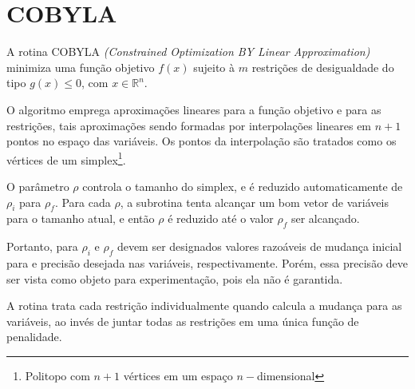 %
%
%

\section{COBYLA}

A rotina COBYLA \emph{(Constrained Optimization BY Linear Approximation)}
minimiza uma função objetivo $f(x)$ sujeito à $m$ restrições de desigualdade
do tipo $g(x)\leq0$, com $x\in\mathbb{R}^n$.

O algoritmo emprega aproximações lineares para a função objetivo e para as
restrições, tais aproximações sendo formadas por interpolações lineares em
$n+1$ pontos no espaço das variáveis. Os pontos da interpolação são tratados
como os vértices de um simplex\footnote{Politopo com $n+1$ vértices em um
espaço $n-$dimensional}.

O parâmetro $\rho$ controla o tamanho do simplex, e é reduzido automaticamente
de $\rho_i$ para $\rho_f$. Para cada $\rho$, a subrotina tenta alcançar um bom
vetor de variáveis para o tamanho atual, e então $\rho$ é reduzido até o valor
$\rho_f$ ser alcançado.

Portanto, para $\rho_i$ e $\rho_f$ devem ser designados valores razoáveis de
mudança inicial para e precisão desejada nas variáveis, respectivamente. Porém,
essa precisão deve ser vista como objeto para experimentação, pois ela não é
garantida.

A rotina trata cada restrição individualmente quando calcula a mudança para as
variáveis, ao invés de juntar todas as restrições em uma única função de
penalidade.
